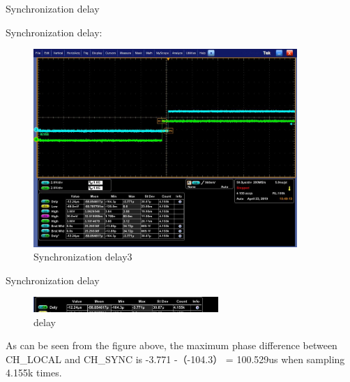 \begin{frame}[fragile]{Synchronization delay}

Synchronization delay:

  \begin{figure}[htbp]
  \begin{center}
  \includegraphics[width=10cm]{img/mis3}
  \caption{Synchronization delay3}
  \label{report}
  \end{center}
  \vspace{-0.5em}
  \end{figure}

\end{frame}


\begin{frame}[fragile]{Synchronization delay}

  \begin{figure}[htbp]
  \begin{center}
  \includegraphics[width=7cm]{img/delay}
  \caption{delay}
  \label{report}
  \end{center}
  \vspace{-0.5em}
  \end{figure}


As can be seen from the figure above, the maximum phase difference between CH\_LOCAL and CH\_SYNC is -3.771 -（-104.3） = 100.529us  when sampling 4.155k times.

\end{frame}


